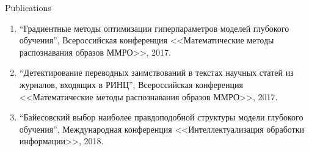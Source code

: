 \documentclass[usenames,dvipsnames,11pt,pdf,utf8,russian,aspectratio=43]{beamer}
\begin{document}
\begin{frame}{Publications}
\begin{enumerate}
\item ``Градиентные методы оптимизации гиперпараметров моделей глубокого обучения'', Всероссийская конференция <<Математические методы распознавания образов ММРО>>, 2017.
\item ``Детектирование переводных заимствований в текстах научных статей из журналов, входящих в РИНЦ'', Всероссийская конференция <<Математические методы распознавания образов ММРО>>, 2017.
\item ``Байесовский выбор наиболее правдоподобной структуры модели глубокого обучения'', Международная конференция <<Интеллектуализация обработки информации>>, 2018.
\end{enumerate}
\end{frame}
\end{document}
